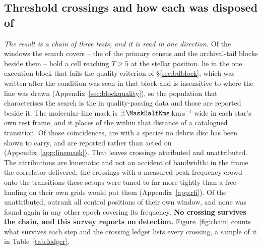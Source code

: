 \subsection{Threshold crossings and how each was disposed of}
\label{sec:technosearch}

\emph{The result is a chain of three tests, and it is read in one direction.}
Of the windows the search covers -- the \NWindows{} of the primary census
and the archival-tail blocks beside them -- \EvNCrossRaw{} hold a cell
reaching $T\geq5$ at the stellar position. \EvNCrossFlag{} lie in the one
execution block that fails the quality criterion of \S\ref{sec:bdblock}, which
was written after the condition was seen in that block and is insensitive to
where the line was drawn (Appendix~\ref{sec:blockquality}), so the population
that characterises the search is the \EvNCrossQp{} in quality-passing data and
those \EvNCrossFlag{} are reported beside it. The molecular-line mask is $\pm\MaskHalfKms$\,km\,s$^{-1}$ wide in each
star's own rest frame, and it places \MkNCoinc{} of the \EvNCrossQp{} within
that distance of a catalogued transition. Of those coincidences, \MkNSODecideWord{} are with a species no debris disc
has been shown to carry, and are reported rather than acted on
(Appendix~\ref{app:linemask}). That leaves
\EvNAttrQp{} crossings attributed and \EvNUnattrQp{} unattributed. The attributions are kinematic and not an accident of bandwidth: in the
frame the correlator delivered, the crossings with a measured peak frequency
crowd onto the transitions these setups were tuned to far more tightly than a
free landing on their own grids would put them (Appendix~\ref{app:rfi}). Of the unattributed,
\EvNRankQp{} outrank all \NCtrl{} control positions of their own window, and
none was found again in any other epoch covering its frequency. \textbf{No
crossing survives the chain, and this survey reports no detection.}
Figure~\ref{fig:chain} counts what survives each step and the crossing
ledger lists every crossing, a sample of it in Table~\ref{tab:ledger}.

